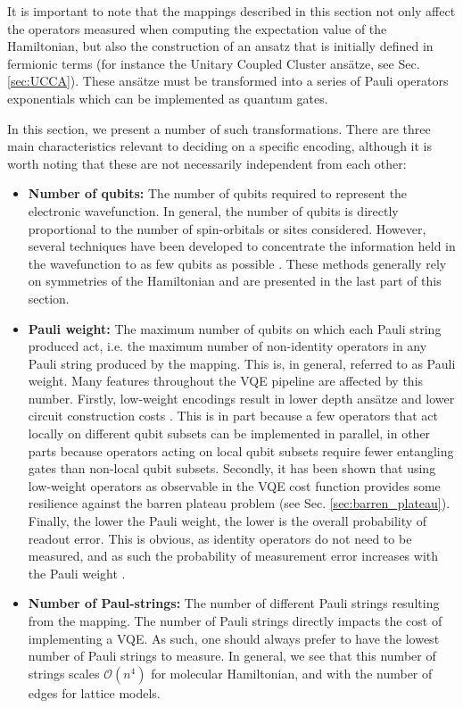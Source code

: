 It is important to note that the mappings described in this section not only affect the operators measured when computing the expectation value of the Hamiltonian, but also the construction of an ansatz that is initially defined in fermionic terms (for instance the Unitary Coupled Cluster ans{\"{a}}tze, see Sec. \ref{sec:UCCA}). These ans{\"{a}}tze must be transformed into a series of Pauli operators exponentials which can be implemented as quantum gates.

In this section, we present a number of such transformations. There are three main characteristics relevant to deciding on a specific encoding, although it is worth noting that these are not necessarily independent from each other:
\begin{itemize}
    \item \textbf{Number of qubits:} The number of qubits required to represent the electronic wavefunction. In general, the number of qubits is directly proportional to the number of spin-orbitals or sites considered. However, several techniques have been developed to concentrate the information held in the wavefunction to as few qubits as possible \cite{Moll2016, bravyi_tapering_2017, Steudtner2018, Setia2020, Kirby2021_CSVQE}. These methods generally rely on symmetries of the Hamiltonian and are presented in the last part of this section. 
    \item \textbf{Pauli weight:} The maximum number of qubits on which each Pauli string produced act, i.e. the maximum number of non-identity operators in any Pauli string produced by the mapping. This is, in general, referred to as Pauli weight. Many features throughout the VQE pipeline are affected by this number. Firstly, low-weight encodings result in lower depth ans{\"{a}}tze and lower circuit construction costs \cite{Havlek2017, Clinton2020, Cade2020}. This is in part because a few operators that act locally on different qubit subsets can be implemented in parallel, in other parts because operators acting on local qubit subsets require fewer entangling gates than non-local qubit subsets. Secondly, it has been shown that using low-weight operators as observable in the VQE cost function provides some resilience against the barren plateau problem \cite{Cerezo2021_BP} (see Sec. \ref{sec:barren_plateau}). Finally, the lower the Pauli weight, the lower is the overall probability of readout error. This is obvious, as identity operators do not need to be measured, and as such the probability of measurement error increases with the Pauli weight \cite{Huggins2021}.
    \item \textbf{Number of Paul-strings:} The number of different Pauli strings resulting from the mapping. The number of Pauli strings directly impacts the cost of implementing a VQE. As such, one should always prefer to have the lowest number of Pauli strings to measure. In general, we see that this number of strings scales $\mathcal{O}(n^4)$ for molecular Hamiltonian, and with the number of edges for lattice models.  
\end{itemize}

